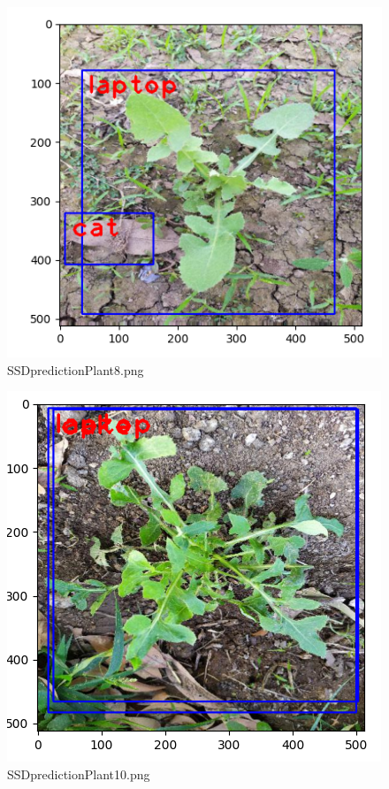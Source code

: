 \documentclass[12pt]{exam}
\begin{document}
\begin{questions}
\begin{parts}
		\hfill

		\begin{figure}[H]
			\includegraphics[width=\textwidth]{images-SSD/plant8.png}
			\caption{SSDpredictionPlant8.png}
		\end{figure}

		\hfill

		\begin{figure}[H]
			\includegraphics[width=\textwidth]{images-SSD/plant10.png}
			\caption{SSDpredictionPlant10.png}
		\end{figure}


\end{parts}
\end{questions}
\end{document}

